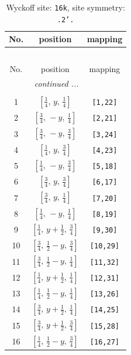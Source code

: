\documentclass[fleqn,8pt]{jsarticle}
\begin{document}
\renewcommand{\arraystretch}{1.2}
\begin{longtable}{ccc}
\caption{Wyckoff site: {\tt 16k}, site symmetry: {\tt .2'.}}
 \\
 \hline \hline
No. & position & mapping \\ \hline \endfirsthead

\multicolumn{2}{l}{\tablename\ \thetable{}} \\
 \hline \hline
No. & position & mapping \\ \hline \endhead

 \hline \hline
\multicolumn{2}{r}{\footnotesize\it continued ...} \\ \endfoot

 \hline \hline
\multicolumn{2}{r}{} \\ \endlastfoot

1 & $\left[ \frac{1}{4},\, y,\, \frac{1}{4} \right]$ & {\tt [1,22]} \\ \hline
2 & $\left[ \frac{3}{4},\, - y,\, \frac{1}{4} \right]$ & {\tt [2,21]} \\ \hline
3 & $\left[ \frac{3}{4},\, - y,\, \frac{3}{4} \right]$ & {\tt [3,24]} \\ \hline
4 & $\left[ \frac{1}{4},\, y,\, \frac{3}{4} \right]$ & {\tt [4,23]} \\ \hline
5 & $\left[ \frac{1}{4},\, - y,\, \frac{3}{4} \right]$ & {\tt [5,18]} \\ \hline
6 & $\left[ \frac{3}{4},\, y,\, \frac{3}{4} \right]$ & {\tt [6,17]} \\ \hline
7 & $\left[ \frac{3}{4},\, y,\, \frac{1}{4} \right]$ & {\tt [7,20]} \\ \hline
8 & $\left[ \frac{1}{4},\, - y,\, \frac{1}{4} \right]$ & {\tt [8,19]} \\ \hline
9 & $\left[ \frac{1}{4},\, y + \frac{1}{2},\, \frac{3}{4} \right]$ & {\tt [9,30]} \\ \hline
10 & $\left[ \frac{3}{4},\, \frac{1}{2} - y,\, \frac{3}{4} \right]$ & {\tt [10,29]} \\ \hline
11 & $\left[ \frac{3}{4},\, \frac{1}{2} - y,\, \frac{1}{4} \right]$ & {\tt [11,32]} \\ \hline
12 & $\left[ \frac{1}{4},\, y + \frac{1}{2},\, \frac{1}{4} \right]$ & {\tt [12,31]} \\ \hline
13 & $\left[ \frac{1}{4},\, \frac{1}{2} - y,\, \frac{1}{4} \right]$ & {\tt [13,26]} \\ \hline
14 & $\left[ \frac{3}{4},\, y + \frac{1}{2},\, \frac{1}{4} \right]$ & {\tt [14,25]} \\ \hline
15 & $\left[ \frac{3}{4},\, y + \frac{1}{2},\, \frac{3}{4} \right]$ & {\tt [15,28]} \\ \hline
16 & $\left[ \frac{1}{4},\, \frac{1}{2} - y,\, \frac{3}{4} \right]$ & {\tt [16,27]} \\
\end{longtable}
\end{document}
